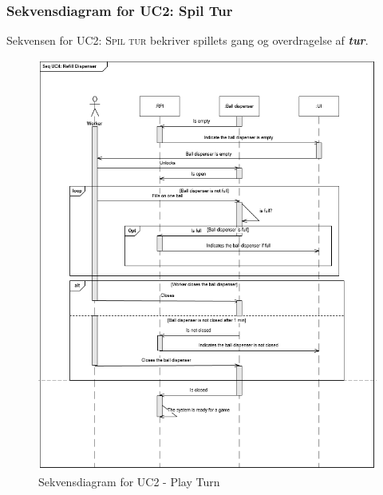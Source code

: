 \documentclass[Rapport/Rapport_main.tex]{subfiles}
\begin{document}
\subsubsection{Sekvensdiagram for UC2: Spil Tur}
Sekvensen for \textsc{UC2: Spil tur} bekriver spillets gang og overdragelse af \textit{\textbf{tur}}.
\begin{figure}
    \centering 
    \includegraphics[scale=0.85]{Arkitektur/Sekvensdiagrammer/graphics/sd_UC2.png}
    \caption{Sekvensdiagram for UC2 - Play Turn}
    \label{fig:rap_sd_UC2}
\end{figure}
\end{document}
